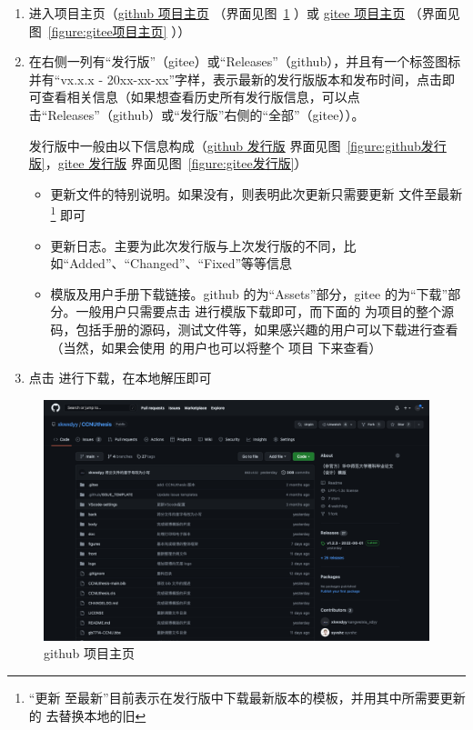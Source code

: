 \documentclass{ccnudoc}
\begin{document}
\begin{enumerate}
  \item 进入项目主页（\href{https://github.com/xkwxdyy/CCNUthesis}{github 项目主页} （界面见图~\ref{figure:github项目主页} ）或 \href{https://gitee.com/xkwxdyy/CCNUthesis}{gitee 项目主页} （界面见图~\ref{figure:gitee项目主页} ））
  \item 在右侧一列有“发行版”（gitee）或“Releases”（github），并且有一个标签图标并有“vx.x.x - 20xx-xx-xx”字样，表示最新的发行版版本和发布时间，点击即可查看相关信息（如果想查看历史所有发行版信息，可以点击“Releases”（github）或“发行版”右侧的“全部”（gitee））。
  
    发行版中一般由以下信息构成（\href{https://github.com/xkwxdyy/CCNUthesis/releases}{github 发行版} 界面见图~\ref{figure:github发行版}，\href{https://gitee.com/xkwxdyy/CCNUthesis/releases}{gitee 发行版} 界面见图~\ref{figure:gitee发行版}）
      \begin{itemize}
        \item 更新文件的特别说明。如果没有，则表明此次更新只需要更新  文件至最新\footnote{“更新  至最新”目前表示在发行版中下载最新版本的模板，并用其中所需要更新的  去替换本地的旧 } 即可
        \item 更新日志。主要为此次发行版与上次发行版的不同，比如“Added”、“Changed”、“Fixed”等等信息
        \item 模版及用户手册下载链接。github 的为“Assets”部分，gitee 的为“下载”部分。一般用户只需要点击  进行模版下载即可，而下面的  为项目的整个源码，包括手册的源码，测试文件等，如果感兴趣的用户可以下载进行查看（当然，如果会使用  的用户也可以将整个  项目  下来查看）
      \end{itemize}
  \item 点击  进行下载，在本地解压即可
\end{enumerate}

\begin{figure}[htbp]
  \centering
  \includegraphics[width = \textwidth]{github项目主页.png}
  \caption{github 项目主页}
  \label{figure:github项目主页}
\end{figure}
\end{document}
